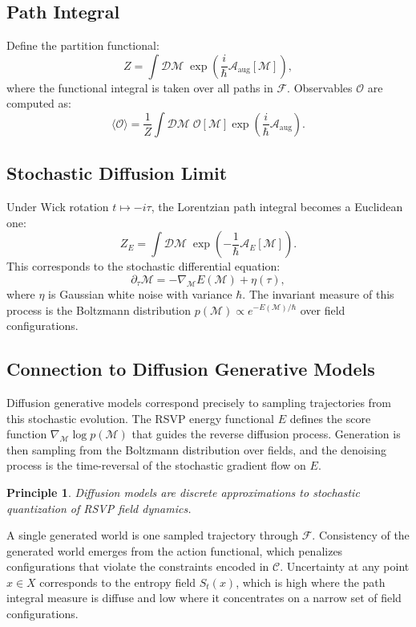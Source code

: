 \documentclass[11pt]{article}
\newtheorem{principle}{Principle}
\begin{document}
\subsection{Path Integral}

Define the partition functional:
\[
Z = \int \mathcal{D}\mathcal{M}\;
\exp\left(
\frac{i}{\hbar} \mathcal{A}_{\text{aug}}[\mathcal{M}]
\right),
\]
where the functional integral is taken over all paths in $\mathcal{F}$.
Observables $\mathcal{O}$ are computed as:
\[
\langle \mathcal{O} \rangle
=
\frac{1}{Z}
\int \mathcal{D}\mathcal{M}\;
\mathcal{O}[\mathcal{M}]
\exp\left(
\frac{i}{\hbar} \mathcal{A}_{\text{aug}}
\right).
\]

\subsection{Stochastic Diffusion Limit}

Under Wick rotation $t \mapsto -i\tau$, the Lorentzian path integral
becomes a Euclidean one:
\[
Z_E
=
\int \mathcal{D}\mathcal{M}\;
\exp\left(
-\frac{1}{\hbar} \mathcal{A}_E[\mathcal{M}]
\right).
\]
This corresponds to the stochastic differential equation:
\[
\partial_\tau \mathcal{M}
=
-\nabla_{\mathcal{M}} E(\mathcal{M})
+
\eta(\tau),
\]
where $\eta$ is Gaussian white noise with variance $\hbar$.
The invariant measure of this process is the Boltzmann distribution
$p(\mathcal{M}) \propto e^{-E(\mathcal{M})/\hbar}$ over field configurations.

\subsection{Connection to Diffusion Generative Models}

Diffusion generative models correspond precisely to sampling trajectories
from this stochastic evolution.
The RSVP energy functional $E$ defines the score function
$\nabla_{\mathcal{M}} \log p(\mathcal{M})$ that guides the reverse diffusion
process.
Generation is then sampling from the Boltzmann distribution over fields,
and the denoising process is the time-reversal of the stochastic gradient
flow on $E$.

\begin{principle}
Diffusion models are discrete approximations to stochastic quantization
of RSVP field dynamics.
\end{principle}

A single generated world is one sampled trajectory through $\mathcal{F}$.
Consistency of the generated world emerges from the action functional,
which penalizes configurations that violate the constraints encoded in
$\mathcal{C}$.
Uncertainty at any point $x \in X$ corresponds to the entropy field
$S_t(x)$, which is high where the path integral measure is diffuse and
low where it concentrates on a narrow set of field configurations.
\end{document}

